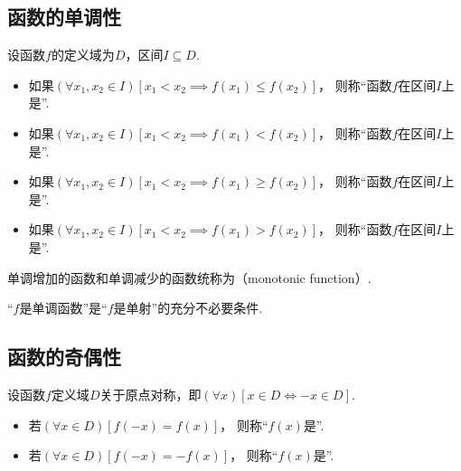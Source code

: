 \subsection{函数的单调性}
\begin{definition}
设函数\(f\)的定义域为\(D\)，区间\(I \subseteq D\).
\begin{itemize}
	\item 如果\((\forall x_1,x_2\in I)
	[x_1 < x_2 \implies f(x_1) \leq f(x_2)]\)，
	则称“函数\(f\)在区间\(I\)上是”.

	\item 如果\((\forall x_1,x_2\in I)
	[x_1 < x_2 \implies f(x_1) < f(x_2)]\)，
	则称“函数\(f\)在区间\(I\)上是”.

	\item 如果\((\forall x_1,x_2\in I)
	[x_1 < x_2 \implies f(x_1) \geq f(x_2)]\)，
	则称“函数\(f\)在区间\(I\)上是”.

	\item 如果\((\forall x_1,x_2\in I)
	[x_1 < x_2 \implies f(x_1) > f(x_2)]\)，
	则称“函数\(f\)在区间\(I\)上是”.
\end{itemize}

单调增加的函数和单调减少的函数统称为（monotonic function）.
\end{definition}

\begin{proposition}
“\(f\)是单调函数”是“\(f\)是单射”的充分不必要条件.
\end{proposition}

\subsection{函数的奇偶性}
\begin{definition}
设函数\(f\)定义域\(D\)关于原点对称，即\((\forall x)[x \in D \iff -x \in D]\).
\begin{itemize}
	\item 若\((\forall x \in D)
	[f(-x) = f(x)]\)，
	则称“\(f(x)\)是”.

	\item 若\((\forall x \in D)
	[f(-x) = -f(x)]\)，
	则称“\(f(x)\)是”.
\end{itemize}
\end{definition}

